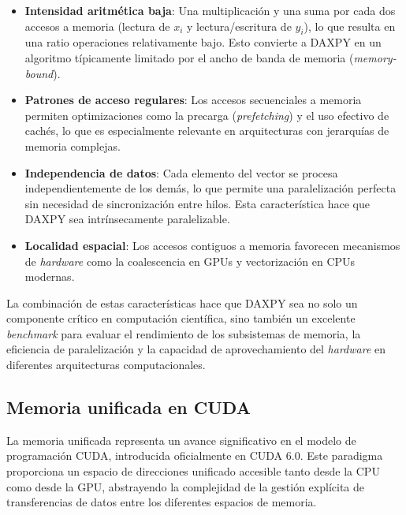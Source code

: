         \begin{itemize}
        
            \item \textbf{Intensidad aritmética baja}: Una multiplicación y una suma por cada dos accesos a memoria (lectura de $x_i$ y lectura/escritura de $y_i$), lo que resulta en una ratio operaciones relativamente bajo. Esto convierte a DAXPY en un algoritmo típicamente limitado por el ancho de banda de memoria (\textit{memory-bound}).
            
            \item \textbf{Patrones de acceso regulares}: Los accesos secuenciales a memoria permiten optimizaciones como la precarga (\textit{prefetching}) y el uso efectivo de cachés, lo que es especialmente relevante en arquitecturas con jerarquías de memoria complejas.
            
            \item \textbf{Independencia de datos}: Cada elemento del vector se procesa independientemente de los demás, lo que permite una paralelización perfecta sin necesidad de sincronización entre hilos. Esta característica hace que DAXPY sea intrínsecamente paralelizable.
            
            \item \textbf{Localidad espacial}: Los accesos contiguos a memoria favorecen mecanismos de \textit{hardware} como la coalescencia en GPUs y vectorización en CPUs modernas.
            
        \end{itemize}

        La combinación de estas características hace que DAXPY sea no solo un componente crítico en computación científica, sino también un excelente \textit{benchmark} para evaluar el rendimiento de los subsistemas de memoria, la eficiencia de paralelización y la capacidad de aprovechamiento del \textit{hardware} en diferentes arquitecturas computacionales.

    \subsection{Memoria unificada en CUDA}
    
        La memoria unificada representa un avance significativo en el modelo de programación CUDA, introducida oficialmente en CUDA 6.0. Este paradigma proporciona un espacio de direcciones unificado accesible tanto desde la CPU como desde la GPU, abstrayendo la complejidad de la gestión explícita de transferencias de datos entre los diferentes espacios de memoria.
    
